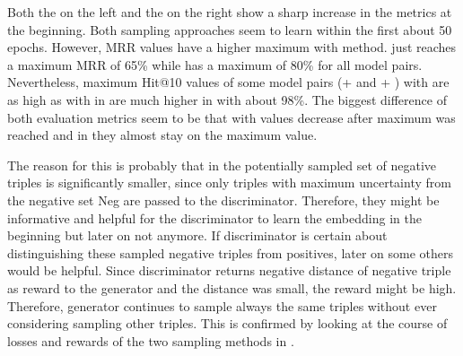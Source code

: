 Both the \usmax  on the left and the \ussoftmax on the right show a sharp increase in the metrics at the beginning.
Both sampling approaches seem to learn within the first about 50 epochs.
However, MRR values have a higher maximum with \ussoftmax method.
\usmax just reaches a maximum MRR of 65\% while \ussoftmax has a maximum of  80\% for all model pairs.
Nevertheless, maximum Hit@10 values of some model pairs (\distmult + \transd and \complex + \transe) with \usmax are as high as with \ussoftmax in are much higher in \ussoftmax with about 98\%.
The biggest difference of both evaluation metrics seem to be that with \usmax values decrease after maximum was reached and in \ussoftmax they almost stay on the maximum value.

The reason for this is probably that in \usmax the potentially sampled set of negative triples is significantly smaller, since only triples with maximum uncertainty from the negative set Neg are passed to the discriminator.
Therefore, they might be informative and helpful for the discriminator to learn the embedding in the beginning but later on not anymore.
If discriminator is certain about distinguishing these sampled negative triples from positives, later on some others would be helpful.
Since discriminator returns negative distance of negative triple as reward to the generator and the distance was small, the reward might be high.
Therefore, generator continues to sample always the same triples without ever considering sampling other triples.
This is confirmed by looking at the course of losses and rewards of the two sampling methods in .
